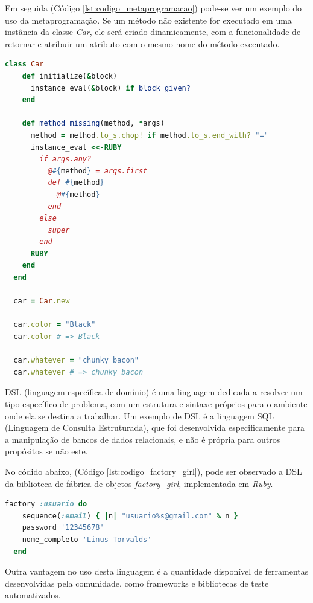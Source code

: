\pagebreak

Em seguida (Código \ref{lst:codigo_metaprogramacao}) pode-se ver um exemplo do uso da metaprogramação. Se um método não existente for executado em uma instância da classe \textit{Car}, ele será criado dinamicamente, com a funcionalidade de retornar e atribuir um atributo com o mesmo nome do método executado.

{\singlespace
\begin{lstlisting}[caption=Metaprogramação em \textit{Ruby}, language=Ruby, label={lst:codigo_metaprogramacao}]
  class Car
    def initialize(&block)
      instance_eval(&block) if block_given?
    end

    def method_missing(method, *args)
      method = method.to_s.chop! if method.to_s.end_with? "="
      instance_eval <<-RUBY
        if args.any?
          @#{method} = args.first
          def #{method}
            @#{method}
          end
        else
          super
        end
      RUBY
    end
  end

  car = Car.new

  car.color = "Black"
  car.color # => Black

  car.whatever = "chunky bacon"
  car.whatever # => chunky bacon
\end{lstlisting}
}

DSL (linguagem específica de domínio) é uma linguagem dedicada a resolver um tipo específico de problema, com um estrutura e sintaxe próprios para o ambiente onde ela se destina a trabalhar. Um exemplo de DSL é a linguagem SQL (Linguagem de Consulta Estruturada), que foi desenvolvida especificamente para a manipulação de bancos de dados relacionais, e não é própria para outros propósitos se não este.

No códido abaixo, (Código \ref{lst:codigo_factory_girl}), pode ser observado a DSL da biblioteca de fábrica de objetos \textit{factory\_girl}, implementada em \textit{Ruby}.

{\singlespace
\begin{lstlisting}[caption=DSL da biblioteca \textit{factory\_girl}, language=Ruby, label={lst:codigo_factory_girl}]
  factory :usuario do
    sequence(:email) { |n| "usuario%s@gmail.com" % n }
    password '12345678'
    nome_completo 'Linus Torvalds'
  end
\end{lstlisting}
}

Outra vantagem no uso desta linguagem é a quantidade disponível de ferramentas desenvolvidas pela comunidade, como frameworks e bibliotecas de teste automatizados.

